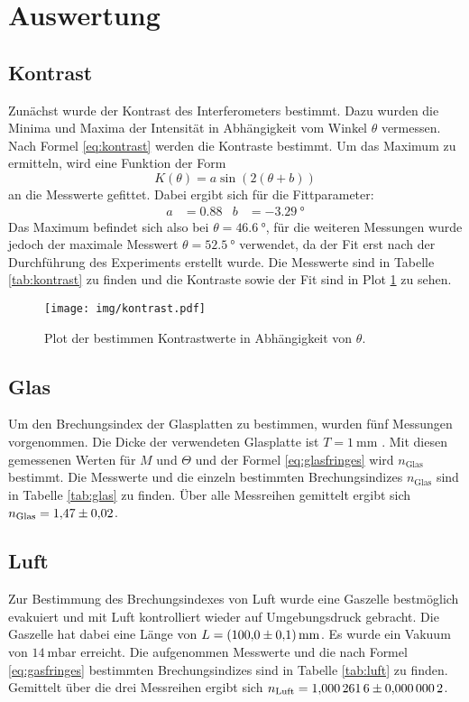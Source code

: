 \section{Auswertung}
\label{sec:Auswertung}


\subsection{Kontrast}

Zunächst wurde der Kontrast des Interferometers bestimmt. Dazu wurden die Minima und Maxima der Intensität in Abhängigkeit vom Winkel $\theta$ vermessen. Nach Formel \eqref{eq:kontrast} werden die Kontraste bestimmt.  Um das Maximum zu ermitteln, wird eine Funktion der Form
\begin{equation}
  K(\theta)=a\sin(2(\theta+b))
\end{equation}
an die Messwerte gefittet. Dabei ergibt sich für die Fittparameter:
\begin{align}
  a&=\num{0,88} & b&=\SI{-3,29}{°}
\end{align}
Das Maximum befindet sich also bei $\theta=\SI{46.6}{°}$, für die weiteren Messungen wurde jedoch der maximale Messwert $\theta=\SI{52.5}{°}$ verwendet, da der Fit erst nach der Durchführung des Experiments erstellt wurde.
Die Messwerte sind in Tabelle \ref{tab:kontrast} zu finden und die  Kontraste sowie der Fit sind in Plot \ref{img:kontrast} zu sehen.
\begin{figure}
  \centering
  \texttt{[image: img/kontrast.pdf]}
  \caption{Plot der bestimmen Kontrastwerte in Abhängigkeit von $\theta$.}
  \label{img:kontrast}
\end{figure}




\subsection{Glas}

Um den Brechungsindex der Glasplatten zu bestimmen, wurden fünf Messungen vorgenommen. Die Dicke der verwendeten Glasplatte ist $T=\SI{1}{\milli\meter}$ \cite{V64}.
Mit diesen gemessenen Werten für $M$ und $\Theta$ und der Formel \eqref{eq:glasfringes} wird $n_\text{Glas}$ bestimmt. Die Messwerte und die einzeln bestimmten Brechungsindizes
 $n_\text{Glas}$ sind in Tabelle \ref{tab:glas} zu finden.
Über alle Messreihen gemittelt ergibt sich $n_\text{Glas}=\num{1,47\pm 0,02}$.




\subsection{Luft}

Zur Bestimmung des Brechungsindexes von Luft wurde eine Gaszelle bestmöglich evakuiert und mit Luft kontrolliert wieder auf Umgebungsdruck gebracht. Die Gaszelle hat dabei eine Länge von $L=\SI{100\pm 0.1}{\milli \meter}$. Es wurde ein
Vakuum von $\SI{14}{\milli \bar}$ erreicht. Die aufgenommen Messwerte und die nach Formel \eqref{eq:gasfringes} bestimmten Brechungsindizes sind in Tabelle \ref{tab:luft} zu finden.
Gemittelt über die drei Messreihen ergibt sich $n_\text{Luft}=\num{1.0002616 \pm 0.0000002}$.


